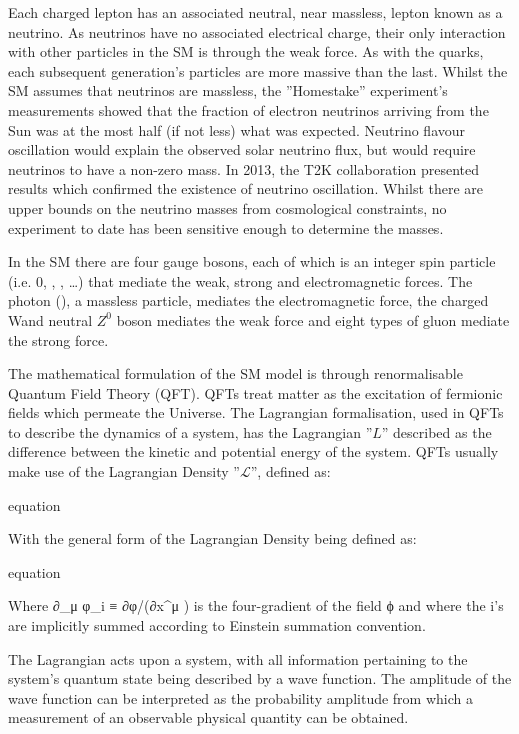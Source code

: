 Each charged lepton has an associated neutral, near massless, lepton known as a neutrino. 
As neutrinos have no associated electrical charge, their only interaction with other particles in the SM is through the weak force. 
As with the quarks, each subsequent generation’s particles are more massive than the last. 
Whilst the SM assumes that neutrinos are massless, the ''Homestake'' experiment’s measurements showed that the fraction of electron neutrinos arriving from the Sun was at the most half (if not less) what was expected\cite{PhysRevLett.20.1205}. 
Neutrino flavour oscillation would explain the observed solar neutrino flux, but would require neutrinos to have a non-zero mass. 
In 2013, the T2K collaboration presented results which confirmed the existence of neutrino oscillation\cite{PhysRevD.88.032002}. 
Whilst there are upper bounds on the neutrino masses from cosmological constraints, no experiment to date has been sensitive enough to determine the masses\cite{1475-7516-2006-06-019}. 

In the SM there are four gauge bosons, each of which is an integer spin particle (i.e. 0, , , …) that mediate the weak, strong and electromagnetic forces. 
The photon (\gamma), a massless particle, mediates the electromagnetic force, the charged W\pm and neutral $Z^0$ boson mediates the weak force and eight types of gluon mediate the strong force\cite{LagrangiansSM}. 

The mathematical formulation of the SM model is through renormalisable Quantum Field Theory (QFT). 
QFTs treat matter as the excitation of fermionic fields which permeate the Universe. 
The Lagrangian formalisation, used in QFTs to describe the dynamics of a system, has the Lagrangian ''$L$'' described as the difference between the kinetic and potential energy of the system. 
QFTs usually make use of the Lagrangian Density ''$\mathscr{L}$'', defined as:

equation

With the general form of the Lagrangian Density being defined as:

equation

Where ∂_μ φ_i  ≡  ∂φ/(∂x^μ ) is the four-gradient of the field ϕ and where the i’s are implicitly summed according to Einstein summation convention.

The Lagrangian acts upon a system, with all information pertaining to the system’s quantum state being described by a wave function. 
The amplitude of the wave function can be interpreted as the probability amplitude from which a measurement of an observable physical quantity can be obtained. 

